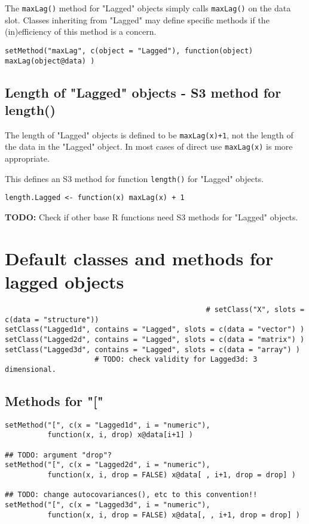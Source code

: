 \documentclass[11pt,a4paper]{article}
\begin{document}
The \texttt{maxLag()} method for "Lagged" objects simply calls \texttt{maxLag()} on the data slot. Classes
inheriting from "Lagged" may define specific methods if the (in)efficiency of this method is
a concern.
\begin{verbatim}
setMethod("maxLag", c(object = "Lagged"), function(object) maxLag(object@data) )
\end{verbatim}


\subsection{Length of "Lagged" objects - S3 method for length()}
\label{sec:orgdd38f87}

The length of "Lagged" objects is defined to be \texttt{maxLag(x)+1}, not the length of the data in
the "Lagged" object. In most cases of direct use \texttt{maxLag(x)} is more appropriate.

This defines an S3 method for function \texttt{length()} for "Lagged" objects.
\begin{verbatim}
length.Lagged <- function(x) maxLag(x) + 1
\end{verbatim}

\textbf{TODO:} Check if other base R functions need S3 methods for "Lagged" objects.



\section{Default classes and methods for lagged objects}
\label{sec:orgc8c11d8}


\begin{verbatim}
                                               # setClass("X", slots = c(data = "structure"))
setClass("Lagged1d", contains = "Lagged", slots = c(data = "vector") )
setClass("Lagged2d", contains = "Lagged", slots = c(data = "matrix") )
setClass("Lagged3d", contains = "Lagged", slots = c(data = "array") )
                     # TODO: check validity for Lagged3d: 3 dimensional.
\end{verbatim}


\subsection{Methods for "["}
\label{sec:org08cf90c}

\begin{verbatim}
setMethod("[", c(x = "Lagged1d", i = "numeric"),
          function(x, i, drop) x@data[i+1] )

## TODO: argument "drop"?
setMethod("[", c(x = "Lagged2d", i = "numeric"),
          function(x, i, drop = FALSE) x@data[ , i+1, drop = drop] )

## TODO: change autocovariances(), etc to this convention!!
setMethod("[", c(x = "Lagged3d", i = "numeric"),
          function(x, i, drop = FALSE) x@data[, , i+1, drop = drop] )
\end{verbatim}
\end{document}
